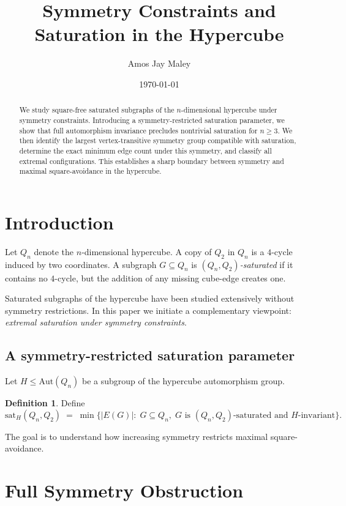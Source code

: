 \documentclass[11pt]{article}
\title{Symmetry Constraints and Saturation in the Hypercube}
\author{Amos Jay Maley}
\date{\today}
\theoremstyle{plain}
\theoremstyle{definition}
\newtheorem{definition}[theorem]{Definition}
\newcommand{\Qn}{Q_n}
\newcommand{\Aut}{\mathrm{Aut}}
\begin{document}
\maketitle

\begin{abstract}
We study square-free saturated subgraphs of the $n$-dimensional hypercube under symmetry constraints.  
Introducing a symmetry-restricted saturation parameter, we show that full automorphism invariance precludes nontrivial saturation for $n\ge3$.  
We then identify the largest vertex-transitive symmetry group compatible with saturation, determine the exact minimum edge count under this symmetry, and classify all extremal configurations.  
This establishes a sharp boundary between symmetry and maximal square-avoidance in the hypercube.
\end{abstract}

\section{Introduction}

Let $\Qn$ denote the $n$-dimensional hypercube.  
A copy of $Q_2$ in $\Qn$ is a $4$-cycle induced by two coordinates.  
A subgraph $G\subseteq \Qn$ is \emph{$(Q_n,Q_2)$-saturated} if it contains no $4$-cycle, but the addition of any missing cube-edge creates one.

Saturated subgraphs of the hypercube have been studied extensively without symmetry restrictions.  
In this paper we initiate a complementary viewpoint: \emph{extremal saturation under symmetry constraints}.

\subsection{A symmetry-restricted saturation parameter}

Let $H\le \Aut(\Qn)$ be a subgroup of the hypercube automorphism group.

\begin{definition}
Define
\[
\mathrm{sat}_H(\Qn,Q_2)
\;=\;
\min\{|E(G)|:\;
G\subseteq \Qn,\;
G\text{ is $(Q_n,Q_2)$-saturated and $H$-invariant}\}.
\]
\end{definition}

The goal is to understand how increasing symmetry restricts maximal square-avoidance.

\section{Full Symmetry Obstruction}
\end{document}
